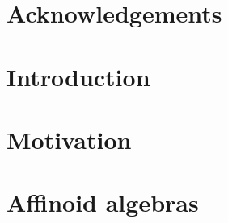 


\rmfamily
\setcounter{page}{0}
\newpage
\tableofcontents
\chapter*{Acknowledgements} \label{chap:acknowledgements}


\setcounter{page}{0}

\chapter{Introduction} \label{chap:introduction}

\chapter{Motivation} \label{chap:motivation}

\chapter{Affinoid algebras} \label{chap:affinoid_algerbas}



